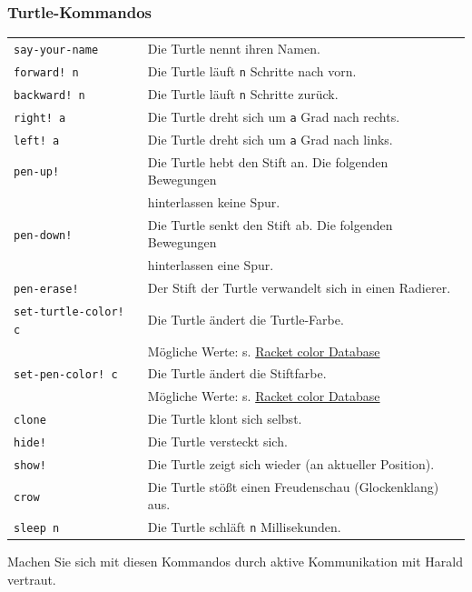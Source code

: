 \documentclass[12pt,a4paper]{scrartcl}
\begin{document}
\subsubsection*{Turtle-Kommandos}
\begin{tabular}{ll}
\texttt{say-your-name}  & Die Turtle nennt ihren Namen.\\
\texttt{forward! n} 	& Die Turtle läuft \texttt{n} Schritte nach vorn. \\
\texttt{backward! n} 	& Die Turtle läuft \texttt{n} Schritte zur\"{u}ck. \\
\texttt{right! a} 		& Die Turtle dreht sich um \texttt{a} Grad nach rechts. \\
\texttt{left! a} 	    & Die Turtle dreht sich um \texttt{a} Grad nach links. \\
\texttt{pen-up!} 		& Die Turtle hebt den Stift an. Die folgenden Bewegungen\\ & hinterlassen keine Spur. \\
\texttt{pen-down!} 		& Die Turtle senkt den Stift ab. Die folgenden Bewegungen\\ & hinterlassen eine Spur. \\
\texttt{pen-erase!}	    & Der Stift der Turtle verwandelt sich in einen Radierer. \\
\texttt{set-turtle-color! c}& Die Turtle \"{a}ndert die Turtle-Farbe. \\
						& M\"{o}gliche Werte: s. \href{http://docs.racket-lang.org/draw/color-database___.html?q=the-color-database}{Racket color Database} \\
\texttt{set-pen-color! c}   & Die Turtle \"{a}ndert die Stiftfarbe. \\
						& M\"{o}gliche Werte: s. \href{http://docs.racket-lang.org/draw/color-database___.html?q=the-color-database}{Racket color Database} \\
\texttt{clone} 			& Die Turtle klont sich selbst. \\
\texttt{hide!} 			& Die Turtle versteckt sich. \\
\texttt{show!} 			& Die Turtle zeigt sich wieder (an aktueller Position).\\
\texttt{crow}           & Die Turtle stößt einen Freudenschau (Glockenklang) aus.\\
\texttt{sleep n}        & Die Turtle schläft \texttt{n} Millisekunden.
\end{tabular}

Machen Sie sich mit diesen Kommandos durch aktive Kommunikation mit Harald vertraut.
\end{document}
